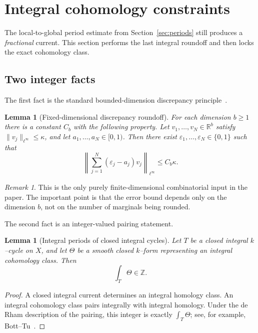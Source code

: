 \documentclass[11pt]{article}
\numberwithin{equation}{section}
\theoremstyle{plain}
\newtheorem{lemma}[theorem]{Lemma}
\theoremstyle{definition}
\theoremstyle{remark}
\newtheorem{remark}[theorem]{Remark}
\newcommand{\R}{\mathbb{R}}
\newcommand{\Z}{\mathbb{Z}}
\begin{document}
\section{Integral cohomology constraints}\label{sec:cohomology}

The local-to-global period estimate from Section~\ref{sec:periods} still produces a \emph{fractional} current.  This section performs the last integral roundoff and then locks the exact cohomology class.

\subsection{Two integer facts}

The first fact is the standard bounded-dimension discrepancy principle~\cite{BaranyGrinberg81}.

\begin{lemma}[Fixed-dimensional discrepancy roundoff]\label{lem:discrepancy}
For each dimension $b\ge 1$ there is a constant $C_b$ with the following property.  Let $v_1,\dots,v_N\in\R^b$ satisfy $\|v_j\|_{\ell^\infty}\le \kappa$, and let $a_1,\dots,a_N\in[0,1)$.  Then there exist $\varepsilon_1,\dots,\varepsilon_N\in\{0,1\}$ such that
\[
\left\|\sum_{j=1}^N (\varepsilon_j-a_j)v_j\right\|_{\ell^\infty}
\le C_b\kappa.
\]
\end{lemma}

\begin{remark}
This is the only purely finite-dimensional combinatorial input in the paper.  The important point is that the error bound depends only on the dimension $b$, not on the number of marginals being rounded.
\end{remark}

The second fact is an integer-valued pairing statement.

\begin{lemma}[Integral periods of closed integral cycles]\label{lem:integral-periods}
Let $T$ be a closed integral $k$--cycle on $X$, and let $\Theta$ be a smooth closed $k$--form representing an integral cohomology class.  Then
\[
\int_T \Theta\in\Z.
\]
\end{lemma}

\begin{proof}
A closed integral current determines an integral homology class.  An integral cohomology class pairs integrally with integral homology.  Under the de Rham description of the pairing, this integer is exactly $\int_T\Theta$; see, for example, Bott--Tu~\cite{BottTu82}.
\end{proof}
\end{document}

